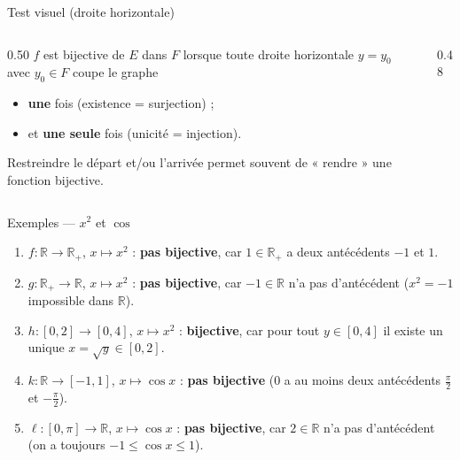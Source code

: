 \documentclass[aspectratio=169,11pt]{beamer}
\newcommand{\R}{\mathbb{R}}
\newcommand{\key}[1]{\textbf{\color{DarkBlue}#1}}
\newcommand{\important}[1]{\textbf{\color{DarkRed}#1}}
\newcommand{\fonc}[3]{#1\colon #2\to #3}
\begin{document}
\begin{frame}{Test visuel (droite horizontale)}
	\begin{columns}[c]
		\begin{column}{0.50\textwidth}
			$f$ est bijective de $E$ dans $F$ lorsque toute droite horizontale
			$y=y_0$ avec $y_0\in F$ coupe le graphe
			\begin{itemize}
				\item \important{une} fois (existence = surjection) ;
				\item et \important{une seule} fois (unicité = injection).
			\end{itemize}
			\vspace{0.15cm}
			\begin{applicationbox}
				Restreindre le départ et/ou l'arrivée permet souvent
				de « rendre » une fonction bijective.
			\end{applicationbox}
		\end{column}
		\begin{column}{0.48\textwidth}
		\end{column}
	\end{columns}
\end{frame}

\begin{frame}{Exemples --- $x^2$ et $\cos$}
	\begin{exemplebox}
		\begin{enumerate}
			\item $\fonc{f}{\R}{\R_+}$, $x\longmapsto x^2$ : \important{pas bijective},
			car $1\in\R_+$ a deux antécédents $-1$ et $1$.
			\item $\fonc{g}{\R_+}{\R}$, $x\longmapsto x^2$ : \important{pas bijective},
			car $-1\in\R$ n'a pas d'antécédent ($x^2=-1$ impossible dans $\R$).
			\item $\fonc{h}{[0,2]}{[0,4]}$, $x\longmapsto x^2$ : \key{bijective},
			car pour tout $y\in[0,4]$ il existe un unique $x=\sqrt{y}\in[0,2]$.
			\item $\fonc{k}{\R}{[-1,1]}$, $x\longmapsto \cos x$ : \important{pas bijective}
			($0$ a au moins deux antécédents $\frac{\pi}{2}$ et $-\frac{\pi}{2}$).
			\item $\fonc{\ell}{[0,\pi]}{\R}$, $x\longmapsto \cos x$ : \important{pas bijective},
			car $2\in\R$ n'a pas d'antécédent (on a toujours $-1\le\cos x\le 1$).
		\end{enumerate}
	\end{exemplebox}
\end{frame}
\end{document}
